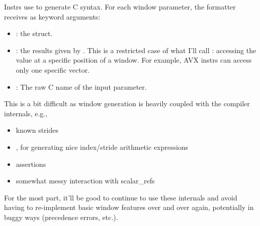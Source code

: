 

\filbreak
Instrs use  to generate C syntax.
For each window parameter, the formatter receives as keyword arguments:
\begin{itemize}
  \item {}: the  struct.
  \filbreak
  \item {}: the results given by .
    This is a restricted case of what I'll call : accessing the value at a specific position of a window. 
    For example, AVX instrs can access only one specific  vector.
  \filbreak
  \item {}: The raw C name of the input parameter.
\end{itemize}

\filbreak
{}

This is a bit difficult as window generation is heavily coupled with the compiler internals, e.g.,

\begin{itemize}
  \item known strides
  \filbreak
  \item {}, for generating nice index/stride arithmetic expressions
  \filbreak
  \item assertions
  \filbreak
  \item somewhat messy interaction with scalar\_refs
\end{itemize}

\filbreak
For the most part, it'll be good to continue to use these internals and avoid having to re-implement basic window features over and over again, potentially in buggy ways (precedence errors, etc.).

